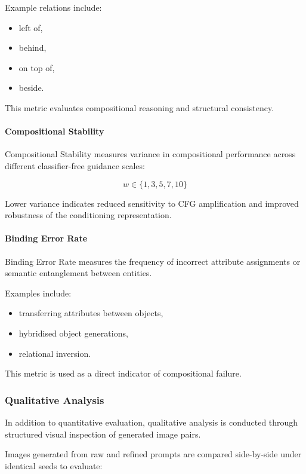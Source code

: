 \documentclass[a4paper,twoside,12pt]{report}
\begin{document}
Example relations include:

\begin{itemize}
    \item left of,
    \item behind,
    \item on top of,
    \item beside.
\end{itemize}

This metric evaluates compositional reasoning and structural consistency.

\paragraph{Compositional Stability}

Compositional Stability measures variance in compositional performance across different classifier-free guidance scales:

\[
w \in \{1,3,5,7,10\}
\]

Lower variance indicates reduced sensitivity to CFG amplification and improved robustness of the conditioning representation.

\paragraph{Binding Error Rate}

Binding Error Rate measures the frequency of incorrect attribute assignments or semantic entanglement between entities.

Examples include:

\begin{itemize}
    \item transferring attributes between objects,
    \item hybridised object generations,
    \item relational inversion.
\end{itemize}

This metric is used as a direct indicator of compositional failure.

\subsubsection{Qualitative Analysis}

In addition to quantitative evaluation, qualitative analysis is conducted through structured visual inspection of generated image pairs.

Images generated from raw and refined prompts are compared side-by-side under identical seeds to evaluate:
\end{document}
